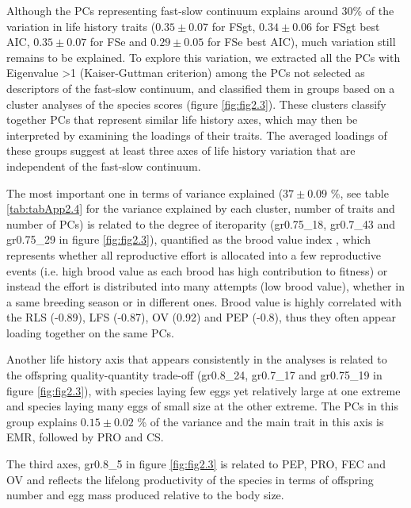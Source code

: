 Although the PCs representing fast-slow continuum explains around 30\% of the
variation in life history traits ($0.35 \pm 0.07$ for FSgt, $0.34 \pm 0.06$ for
FSgt best AIC, $0.35 \pm 0.07$ for FSe and $0.29 \pm 0.05$ for FSe best AIC),
much variation still remains to be explained.
To explore this variation, we extracted all the PCs with Eigenvalue
\textgreater{1} (Kaiser-Guttman criterion) among the
PCs not selected as descriptors of the fast-slow continuum, and classified them
in groups based on a cluster analyses of the species scores (figure
\ref{fig:fig2.3}). These clusters classify together PCs that represent similar
life history axes, which may then be interpreted by examining the loadings
of their traits.
The averaged loadings of these groups suggest at least three axes of life
history variation that are independent of the fast-slow continuum.

The most important one in terms of variance explained ($37 \pm 0.09$ \%, see
table \ref{tab:tabApp2.4} for the variance explained by each cluster, number
of traits and number of PCs) is related to the degree of iteroparity
(gr0.75\_18, gr0.7\_43 and gr0.75\_29 in figure \ref{fig:fig2.3}), quantified as
the brood value index \citep{Bokony2009}⁠, which represents whether all
reproductive effort is allocated into a few reproductive events (i.e. high brood
value as each brood has high contribution to fitness) or instead the effort is
distributed into many attempts (low brood value), whether in a same breeding
season or in different ones. Brood value is highly correlated with the RLS
(-0.89), LFS (-0.87), OV (0.92) and PEP (-0.8), thus they often appear loading
together on the same PCs.

Another life history axis that appears consistently in the analyses is related
to the offspring quality-quantity trade-off (gr0.8\_24, gr0.7\_17 and gr0.75\_19
in figure \ref{fig:fig2.3}), with species laying few eggs yet relatively large
at one extreme and species laying many eggs of small size at the other extreme.
The PCs in this group explains $0.15 \pm 0.02$ \% of the variance and the main
trait in this axis is EMR, followed by PRO and CS.

The third axes, gr0.8\_5 in figure \ref{fig:fig2.3} is related to PEP, PRO, FEC
and OV and reflects the lifelong productivity of the species in terms of
offspring number and egg mass produced relative to the body size.

